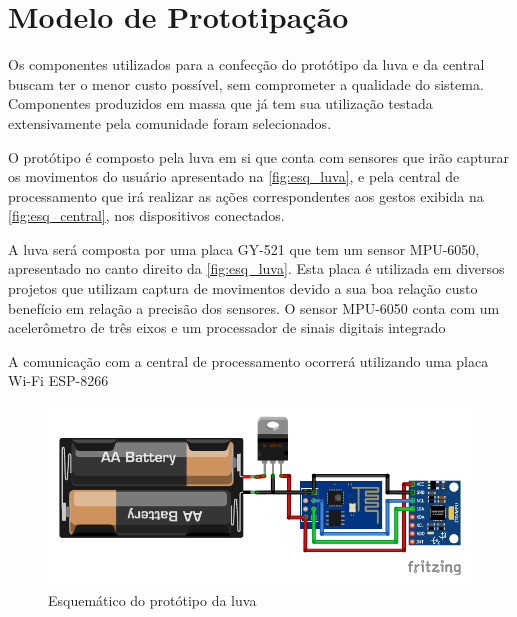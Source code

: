 
\section{Modelo de Prototipação}

Os componentes utilizados para a confecção do protótipo da luva e da central buscam ter o menor custo possível, sem comprometer a qualidade do sistema. Componentes produzidos em massa que já tem sua utilização testada extensivamente pela comunidade foram selecionados. 

O protótipo é composto pela luva em si que conta com sensores que irão capturar os movimentos do usuário apresentado na \autoref{fig:esq_luva}, e pela central de processamento que irá realizar as ações correspondentes aos gestos exibida na \autoref{fig:esq_central}, nos dispositivos conectados.

A luva será composta por uma placa GY-521 que tem um sensor MPU-6050, apresentado no canto direito da \autoref{fig:esq_luva}. Esta placa é utilizada em diversos projetos que utilizam captura de movimentos devido a sua boa relação custo benefício em relação a precisão dos sensores. O sensor MPU-6050 conta com um acelerômetro de três eixos e um processador de sinais digitais integrado

A comunicação com a central de processamento ocorrerá utilizando uma placa Wi-Fi ESP-8266 



\begin{figure}[ht]
    \centering
    \includegraphics{resources/esquematico_tcc_bb.pdf}
    \caption{Esquemático do protótipo da luva}
    \label{fig:esq_luva}
\end{figure}

